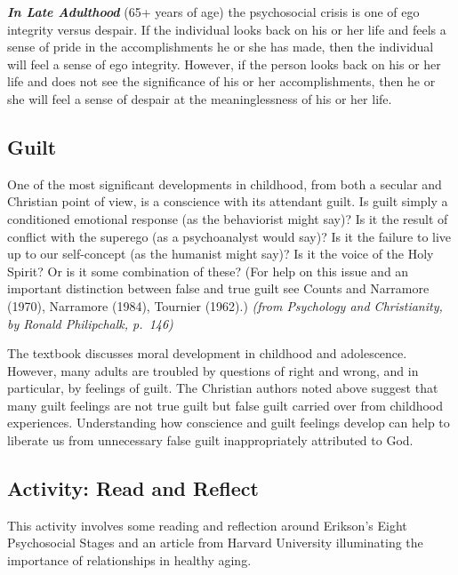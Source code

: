 \documentclass[
]{book}
\begin{document}
\textbf{\emph{In Late Adulthood}} (65+ years of age) the psychosocial crisis is one of ego integrity versus despair. If the individual looks back on his or her life and feels a sense of pride in the accomplishments he or she has made, then the individual will feel a sense of ego integrity. However, if the person looks back on his or her life and does not see the significance of his or her accomplishments, then he or she will feel a sense of despair at the meaninglessness of his or her life.

\hypertarget{guilt}{%
\subsection*{Guilt}\label{guilt}}

One of the most significant developments in childhood, from both a secular and Christian point of view, is a conscience with its attendant guilt. Is guilt simply a conditioned emotional response (as the behaviorist might say)? Is it the result of conflict with the superego (as a psychoanalyst would say)? Is it the failure to live up to our self-concept (as the humanist might say)? Is it the voice of the Holy Spirit? Or is it some combination of these? (For help on this issue and an important distinction between false and true guilt see Counts and Narramore (1970), Narramore (1984), Tournier (1962).) \emph{(from Psychology and Christianity, by Ronald Philipchalk, p.~146)}

The textbook discusses moral development in childhood and adolescence. However, many adults are troubled by questions of right and wrong, and in particular, by feelings of guilt. The Christian authors noted above suggest that many guilt feelings are not true guilt but false guilt carried over from childhood experiences. Understanding how conscience and guilt feelings develop can help to liberate us from unnecessary false guilt inappropriately attributed to God.

\hypertarget{activity-read-and-reflect-1}{%
\subsection*{Activity: Read and Reflect}\label{activity-read-and-reflect-1}}

This activity involves some reading and reflection around Erikson's Eight Psychosocial Stages and an article from Harvard University illuminating the importance of relationships in healthy aging.
\end{document}
